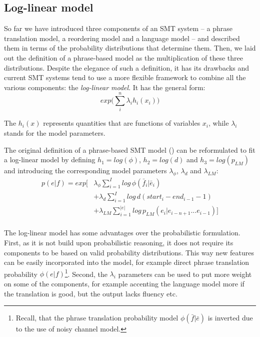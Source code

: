 \subsection{Log-linear model}

So far we have introduced three components of an SMT system -- a phrase translation model,
a reordering model and a language model -- and described them in terms of the probability
distributions that determine them.
Then, we laid out the definition of a phrase-based model as the multiplication of these
three distributions.
Despite the elegance of such a definition, it has its drawbacks and current SMT
systems tend to use a more flexible framework to combine all the various
components: the \emph{log-linear model}.
It has the general form:
\begin{equation}
  exp \Big( \sum_i^n \lambda_i h_i(x_i) \Big)
\end{equation}

The $h_i(x)$ represents quantities that are functions of variables $x_i$,
while $\lambda_i$ stands for the model parameters.

The original definition of a phrase-based SMT model () can be reformulated to
fit a log-linear model by defining $h_1 = log(\phi)$, $h_2 = log(d)$ and $h_3 = log(p_{LM})$
and introducing the corresponding model parameters $\lambda_{\phi}$, $\lambda_{d}$ and $\lambda_{LM}$:
\begin{equation}
  \begin{aligned}
  p(e|f) = exp \Bigg[ &\lambda_{\phi} \sum_{i=1}^I log \, \phi(\bar{f}_i|\bar{e}_i) \\
       &+ \lambda_{d} \sum_{i=1}^{I} log \, d(start_i - end_{i-1} - 1) \\
       &+ \lambda_{LM} \sum_{i=1}^{|e|} log \, p_{LM}(e_i|e_{i-n+1}...e_{i-1}) \Bigg] \\
  \end{aligned}
\end{equation}

The log-linear model has some advantages over the probabilistic formulation.
First, as it is not build upon probabilistic reasoning, it does not require its
components to be based on valid probability distributions.
This way new features can be easily incorporated into the model, for example direct
phrase translation probability $\phi(e|f)$\footnote{Recall, that the phrase translation
probability model $\phi(\bar{f}|\bar{e})$ is inverted due to the use of noisy channel model.}.
Second, the $\lambda_i$ parameters can be used to put more weight on some of the components,
for example accenting the language model more if the translation is good, but the output
lacks fluency etc.

